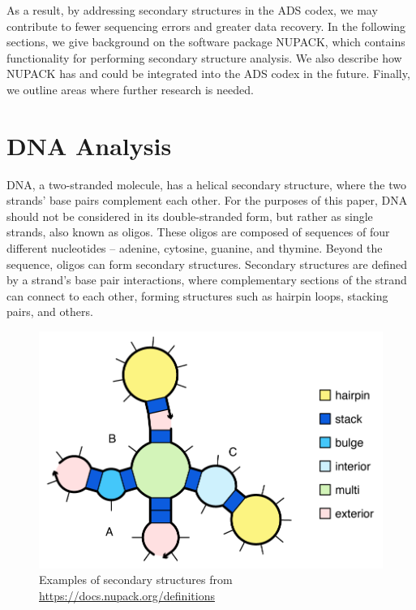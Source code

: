 \documentclass{article}
\begin{document}
As a result, by addressing secondary structures in the ADS codex, we may contribute to fewer sequencing errors and greater data recovery. In the following sections, we give background on the software package NUPACK, which contains functionality for performing secondary structure analysis. We also describe how NUPACK has and could be integrated into the ADS codex in the future. Finally, we outline areas where further research is needed.

\section{DNA Analysis}
DNA, a two-stranded molecule, has a helical secondary structure, where the two strands' base pairs complement each other. For the purposes of this paper, DNA should not be considered in its double-stranded form, but rather as single strands, also known as oligos. These oligos are composed of sequences of four different nucleotides -- adenine, cytosine, guanine, and thymine. Beyond the sequence, oligos can form secondary structures. Secondary structures are defined by a strand's base pair interactions, where complementary sections of the strand can connect to each other, forming structures such as hairpin loops, stacking pairs, and others. 

\begin{figure}[!h]
\centering
\includegraphics[scale=1]{secondary_structures_overview.png}
\caption{Examples of secondary structures from \url{https://docs.nupack.org/definitions}}   
\end{figure} 
\end{document}
